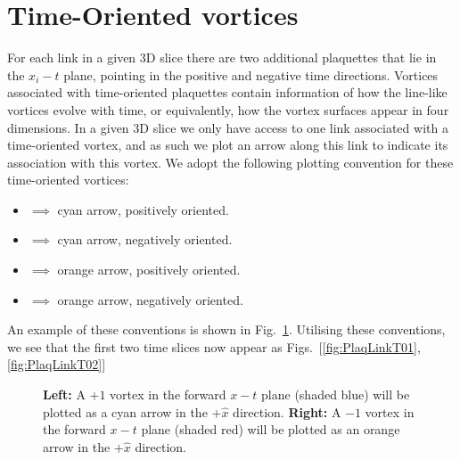 \section{Time-Oriented vortices}
For each link in a given 3D slice there are two additional plaquettes that lie in the $x_i - t$ plane, pointing in the positive and negative time directions. Vortices associated with time-oriented plaquettes contain information of how the line-like vortices evolve with time, or equivalently, how the vortex surfaces appear in four dimensions. In a given 3D slice we only have access to one link associated with a time-oriented vortex, and as such we plot an arrow along this link to indicate its association with this vortex. We adopt the following plotting convention for these time-oriented vortices:
\begin{itemize}[leftmargin=*,itemsep=0pt,labelsep=12pt]
\item  {}  $\implies$ cyan arrow, positively oriented.
\item  {} $\implies$ cyan arrow, negatively oriented.
\item  {}  $\implies$ orange arrow, positively oriented.
\item  {} $\implies$ orange arrow, negatively oriented.
\end{itemize}
An example of these conventions is shown in Fig.~\ref{fig:TimeVortices}. Utilising these conventions, we see that the first two time slices now appear as Figs.~[\ref{fig:PlaqLinkT01}, \ref{fig:PlaqLinkT02}]\\
%
\begin{figure}[ht]
\centering
  \begin{subfigure}[b]{0.45\textwidth}
  \centering
  
  \end{subfigure}
  \hfill
  \begin{subfigure}[b]{0.45\textwidth}
  \centering
  
  \end{subfigure}             
  \caption{\textbf{Left:} A $+1$ vortex in the forward $x-t$ plane (shaded blue) will be plotted as a cyan arrow in the $+\hat{x}$ direction. \textbf{Right:} A $-1$ vortex in the forward $x-t$ plane (shaded red) will be plotted as an orange arrow in the $+\hat{x}$ direction.}
  \label{fig:TimeVortices}
\end{figure}
%
